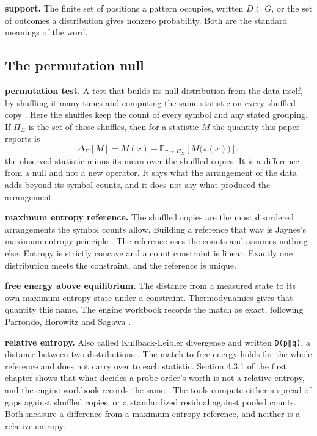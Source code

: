 \noindent\textbf{support.} The finite set of positions a pattern occupies, written \(D \subset G\), or the set of outcomes a distribution gives nonzero probability. Both are the standard meanings of the word.

\subsection{The permutation null}

\noindent\textbf{permutation test.} A test that builds its null distribution from the data itself, by shuffling it many times and computing the same statistic on every shuffled copy \cite{src:Good-2005}. Here the shuffles keep the count of every symbol and any stated grouping. If \(\Pi_\Sigma\) is the set of those shuffles, then for a statistic \(M\) the quantity this paper reports is
\[
\Delta_\Sigma[M] = M(x) - \mathbb{E}_{\pi \sim \Pi_\Sigma}\!\left[M\bigl(\pi(x)\bigr)\right],
\]
the observed statistic minus its mean over the shuffled copies. It is a difference from a null and not a new operator. It says what the arrangement of the data adds beyond its symbol counts, and it does not say what produced the arrangement.

\noindent\textbf{maximum entropy reference.} The shuffled copies are the most disordered arrangements the symbol counts allow. Building a reference that way is Jaynes's maximum entropy principle \cite{src:Jaynes}. The reference uses the counts and assumes nothing else. Entropy is strictly concave and a count constraint is linear. Exactly one distribution meets the constraint, and the reference is unique.

\noindent\textbf{free energy above equilibrium.} The distance from a measured state to its own maximum entropy state under a constraint. Thermodynamics gives that quantity this name. The engine workbook \cite{src:Quigg-orior-workbook} records the match as exact, following Parrondo, Horowitz and Sagawa \cite{src:Parrondo}.

\noindent\textbf{relative entropy.} Also called Kullback-Leibler divergence and written \texttt{D(p‖q)}, a distance between two distributions \cite{src:Kullback}. The match to free energy holds for the whole reference and does not carry over to each statistic. Section 4.3.1 of the first chapter shows that what decides a probe order's worth is not a relative entropy, and the engine workbook records the same \cite{src:Quigg-orior-workbook}. The tools compute either a spread of gaps against shuffled copies, or a standardized residual against pooled counts. Both measure a difference from a maximum entropy reference, and neither is a relative entropy.

